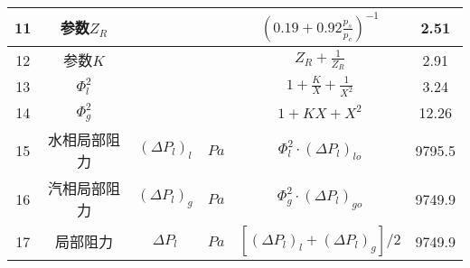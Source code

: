 \begin{table}[H]
{\begin{tabular}{|c|c|c|c|c|c|}
            11   & 参数$ Z_R $                  &                       &            & $ (0.19+0.92 \frac{p_s}{p_c})^{-1} $                                     & 2.51   \\ \hline
            12   & 参数$ K $                    &                       &            & $ Z_R + \frac{1}{Z_R} $                                                  & 2.91   \\ \hline
            13   & $ \Phi_{l}^{2} $             &                       &            & $ 1 + \frac{K}{X} + \frac{1}{X^{2}} $                                    & 3.24   \\ \hline
            14   & $ \Phi_{g}^{2} $             &                       &            & $ 1+KX + X^{2} $                                                         & 12.26  \\ \hline
            15   & 水相局部阻力                 & $ (\Delta P_l)_{l} $  & $ Pa $     & $ \Phi_{l}^{2} \cdot (\Delta P_l)_{lo} $                                 & 9795.5 \\ \hline
            16   & 汽相局部阻力                 & $ (\Delta P_l)_{g} $  & $ Pa $     & $ \Phi_{g}^{2} \cdot (\Delta P_l)_{go} $                                 & 9749.9 \\ \hline
            17   & 局部阻力                     & $ \Delta P_l $        & $ Pa $     & $ [ (\Delta P_l)_{l} + (\Delta P_l)_{g} ] / 2 $                          & 9749.9 \\ \hline
        \end{tabular}
    }
\end{table}

